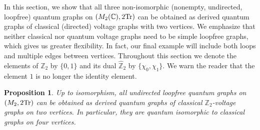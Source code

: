 \documentclass{amsart}
\newtheorem{proposition}[thm]{Proposition}
\theoremstyle{definition}
\theoremstyle{definition}
\begin{document}
In this section, we show that all three non-iso\-morphic (nonempty, undirected, loopfree) quantum graphs on $(M_2(\mathbb{C}),2{\rm Tr})$ can be obtained as derived quantum graphs of classical (directed) voltage graphs with two vertices. We emphasize that neither classical nor quantum voltage graphs need to be simple loopfree graphs, which gives us greater flexibility. In fact, our final example will include both loops and multiple edges between vertices. Throughout this section we denote the elements of $\mathbb{Z}_2$ by $\{0,1\}$ and its dual $\hat{\mathbb{Z}}_2$ by $\{\chi_0,\chi_1\}$. We warn the reader that the element $1$ is no longer the identity element.

\begin{proposition}
    \label{ex::prop:qgraphs_on_M2_as_derived_qgraphs}
    Up to isomorphism, all undirected loopfree quantum graphs on $(M_2,2{\rm Tr})$ can be obtained as derived quantum graphs of classical $\mathbb{Z}_2$-voltage graphs on two vertices. In particular, they are quantum isomorphic to classical graphs on four vertices.
\end{proposition}
\end{document}
